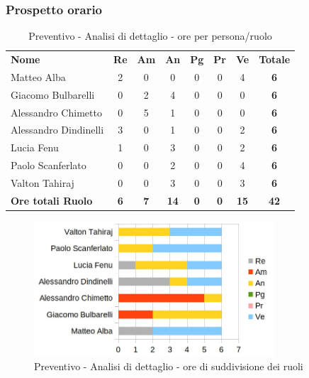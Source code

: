 	\subsubsection{Prospetto orario}
	
		\begin{table} [h!]
			\begin{center}
				\begin{tabular} { m{3.5cm} c c c c c c c }
					\rowcolor{lightgray}
					\textbf{Nome} & \textbf{Re} & \textbf{Am} & \textbf{An} & \textbf{Pg} & \textbf{Pr} & \textbf{Ve} & \textbf{Totale} \\
					Matteo Alba & 2 & 0&0 & 0&0 & 4 & \textbf{6} \\
					Giacomo Bulbarelli & 0& 2 & 4 &0 & 0&0 & \textbf{6} \\
					Alessandro Chimetto &0& 5 & 1 &0 &0 &0 & \textbf{6} \\
					Alessandro Dindinelli & 3 &0 & 1 &0 &0 & 2 & \textbf{6} \\
					Lucia Fenu & 1 &0 & 3 &0 & 0& 2 & \textbf{6} \\
					Paolo Scanferlato &0 & 0& 2 & 0&0 & 4 & \textbf{6} \\
					Valton Tahiraj & 0& 0& 3 &0 & 0& 3 & \textbf{6} \\
					\textbf{Ore totali Ruolo} & \textbf{6} & \textbf{7} & \textbf{14} & \textbf{0} & \textbf{0}& \textbf{15} & \textbf{42}
				\end{tabular}
				\caption{Preventivo - Analisi di dettaglio - ore per persona/ruolo}
			\end{center}
		\end{table}
	
		\begin{figure} [h!]
			\centering
			\includegraphics[width=0.8\textwidth]{res/img/grafici/consolidamento_dei_requisiti_ore_ruolo.jpg}
			\caption{Preventivo - Analisi di dettaglio - ore di suddivisione dei ruoli} 
		\end{figure}
		
